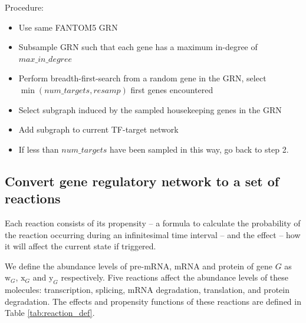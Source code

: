 Procedure:
\begin{itemize}
	\item Use same FANTOM5 GRN
	\item Subsample GRN such that each gene has a maximum in-degree of $max\_in\_degree$
	\item Perform breadth-first-search from a random gene in the GRN, select $\min(num\_targets, resamp)$ first genes encountered
	\item Select subgraph induced by the sampled housekeeping genes in the GRN
	\item Add subgraph to current TF-target network
	\item If less than $num\_targets$ have been sampled in this way, go back to step 2.
\end{itemize}

\subsection{Convert gene regulatory network to a set of reactions} \label{sec:reactions}
Each reaction consists of its propensity -- a formula to calculate
the probability of the reaction occurring during an infinitesimal
time interval -- and the effect -- how it will
 affect the current state if triggered.


\newcommand{\w}[1]{\text{w}_{#1}}
\newcommand{\x}[1]{\text{x}_{#1}}
\newcommand{\y}[1]{\text{y}_{#1}}


\newcommand{\rs}[1]{\text{R}_{#1}}
\newcommand{\rp}[1]{\text{R}^+_{#1}}
\newcommand{\rn}[1]{\text{R}^-_{#1}}

\newcommand{\wpr}[1]{\text{wpr}_{#1}}
\newcommand{\wsr}[1]{\text{wsr}_{#1}}
\newcommand{\xdr}[1]{\text{xdr}_{#1}}
\newcommand{\ypr}[1]{\text{ypr}_{#1}}
\newcommand{\ydr}[1]{\text{ydr}_{#1}}

\newcommand{\str}[1]{\text{str}_{#1}}
\newcommand{\co}[1]{\text{co}_{#1}}
\newcommand{\ind}[1]{\text{ind}_{#1}}
\newcommand{\hmy}[1]{\text{hmy}_{#1}}
\newcommand{\reg}[1]{\text{reg}_{#1}}
\newcommand{\ba}[1]{\text{ba}_{#1}}

We define the abundance levels of pre-mRNA, mRNA and protein of gene $G$ as $\w G$, $\x G$ and $\y G$ respectively. Five reactions affect the abundance levels of these molecules: transcription, splicing, mRNA degradation, translation, and protein degradation. The effects and propensity functions of these reactions are defined in Table \ref{tab:reaction_def}.

